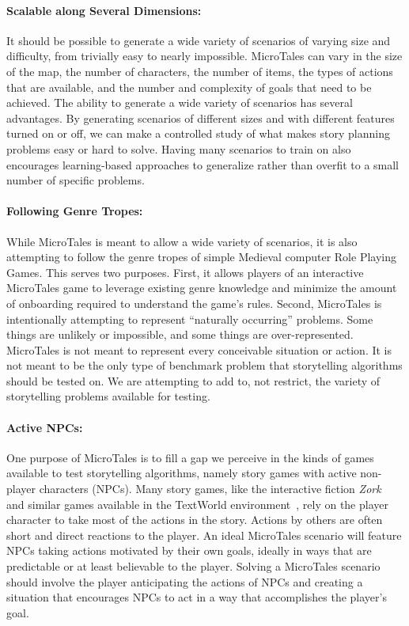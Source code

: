 \documentclass{nilreport}
\begin{document}
\paragraph{Scalable along Several Dimensions:} It should be possible to generate a wide variety of scenarios of varying size and difficulty, from trivially easy to nearly impossible. MicroTales can vary in the size of the map, the number of characters, the number of items, the types of actions that are available, and the number and complexity of goals that need to be achieved. The ability to generate a wide variety of scenarios has several advantages. By generating scenarios of different sizes and with different features turned on or off, we can make a controlled study of what makes story planning problems easy or hard to solve. Having many scenarios to train on also encourages learning-based approaches to generalize rather than overfit to a small number of specific problems.

\paragraph{Following Genre Tropes:} While MicroTales is meant to allow a wide variety of scenarios, it is also attempting to follow the genre tropes of simple Medieval computer Role Playing Games. This serves two purposes. First, it allows players of an interactive MicroTales game to leverage existing genre knowledge and minimize the amount of onboarding required to understand the game's rules. Second, MicroTales is intentionally attempting to represent ``naturally occurring'' problems. Some things are unlikely or impossible, and some things are over-represented. MicroTales is not meant to represent every conceivable situation or action. It is not meant to be the only type of benchmark problem that storytelling algorithms should be tested on. We are attempting to add to, not restrict, the variety of storytelling problems available for testing.

\paragraph{Active NPCs:} One purpose of MicroTales is to fill a gap we perceive in the kinds of games available to test storytelling algorithms, namely story games with active non-player characters (NPCs). Many story games, like the interactive fiction {\em Zork}~\cite{anderson1980zork} and similar games available in the TextWorld environment~\cite{cote2019textworld}, rely on the player character to take most of the actions in the story. Actions by others are often short and direct reactions to the player. An ideal MicroTales scenario will feature NPCs taking actions motivated by their own goals, ideally in ways that are predictable or at least believable to the player. Solving a MicroTales scenario should involve the player anticipating the actions of NPCs and creating a situation that encourages NPCs to act in a way that accomplishes the player's goal.
\end{document}
